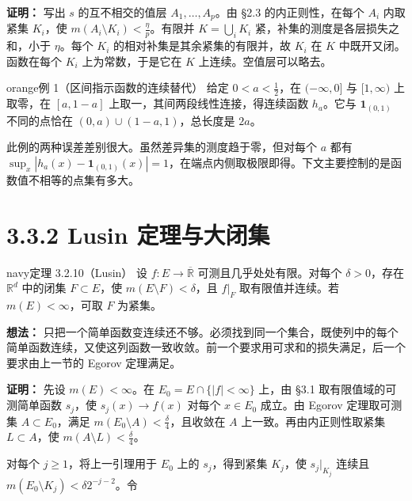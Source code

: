 \documentclass[11pt,a4paper]{article}
\begin{document}
\textbf{证明：} 写出 \(s\) 的互不相交的值层 \(A_1,\ldots,A_p\)。由 §2.3
的内正则性，在每个 \(A_i\) 内取紧集 \(K_i\)，使
\(m(A_i\setminus K_i)<\frac{\eta}{p}\)。有限并 \(K=\bigcup_i K_i\)
紧，补集的测度是各层损失之和，小于 \(\eta\)。每个 \(K_i\)
的相对补集是其余紧集的有限并，故 \(K_i\) 在 \(K\) 中既开又闭。函数在每个
\(K_i\) 上为常数，于是它在 \(K\) 上连续。空值层可以略去。

\begin{sboxenv}{orange}{例 1（区间指示函数的连续替代）}
给定 \(0<a<\frac{1}{2}\)，在 \((-\infty,0]\) 与 \([1,\infty)\)
上取零，在 \([a,1-a]\) 上取一，其间两段线性连接，得连续函数
\(h_a\)。它与 \(\mathbf1_{(0,1)}\) 不同的点恰在
\((0,a)\cup(1-a,1)\)，总长度是 \(2a\)。

\end{sboxenv}

此例的两种误差差别很大。虽然差异集的测度趋于零，但对每个 \(a\) 都有
\(\sup_x |h_a(x)-\mathbf1_{(0,1)}(x)|=1\)，在端点内侧取极限即得。下文主要控制的是函数值不相等的点集有多大。

\clearpage\section[\S{}3.3.2 Lusin
定理与大闭集]{3.3.2 Lusin
定理与大闭集}\label{lusin-ux5b9aux7406ux4e0eux5927ux95edux96c6}

\begin{sboxenv}{navy}{定理 3.2.10（Lusin）}
设 \(f:E\to\overline{\mathbb R}\) 可测且几乎处处有限。对每个
\(\delta>0\)，存在 \(\mathbb R^d\) 中的闭集 \(F\subset E\)，使
\(m(E\setminus F)<\delta\)，且 \(f|_F\) 取有限值并连续。若
\(m(E)<\infty\)，可取 \(F\) 为紧集。

\end{sboxenv}

\textbf{想法：}
只把一个简单函数变连续还不够。必须找到同一个集合，既使列中的每个简单函数连续，又使这列函数一致收敛。前一个要求用可求和的损失满足，后一个要求由上一节的
Egorov 定理满足。

\textbf{证明：} 先设 \(m(E)<\infty\)。在 \(E_0=E\cap\{|f|<\infty\}\)
上，由 §3.1 取有限值域的可测简单函数 \(s_j\)，使 \(s_j(x)\to f(x)\)
对每个 \(x\in E_0\) 成立。由 Egorov 定理取可测集 \(A\subset E_0\)，满足
\(m(E_0\setminus A)<\frac{\delta}{4}\)，且收敛在 \(A\)
上一致。再由内正则性取紧集 \(L\subset A\)，使
\(m(A\setminus L)<\frac{\delta}{4}\)。

对每个 \(j\ge1\)，将上一引理用于 \(E_0\) 上的 \(s_j\)，得到紧集
\(K_j\)，使 \(s_j|_{K_j}\) 连续且
\(m(E_0\setminus K_j)<\delta 2^{-j-2}\)。令
\end{document}
